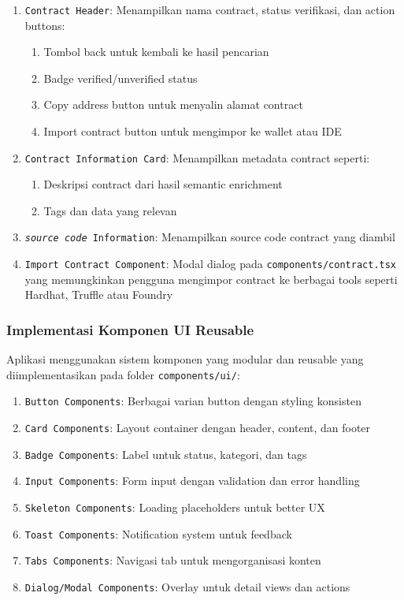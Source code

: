 \begin{enumerate}
	\item \texttt{Contract Header}: Menampilkan nama contract, status verifikasi, dan action buttons:
	      \begin{enumerate}
		      \item Tombol back untuk kembali ke hasil pencarian
		      \item Badge verified/unverified status
		      \item Copy address button untuk menyalin alamat contract
		      \item Import contract button untuk mengimpor ke wallet atau IDE
	      \end{enumerate}
	\item \texttt{Contract Information Card}: Menampilkan metadata contract seperti:
	      \begin{enumerate}
		      \item Deskripsi contract dari hasil semantic enrichment
		      \item Tags dan data yang relevan
	      \end{enumerate}
	\item \texttt{\textit{source code} Information}: Menampilkan source code contract yang diambil
	\item \texttt{Import Contract Component}: Modal dialog pada \texttt{components/\-contract.tsx} yang memungkinkan pengguna mengimpor contract ke berbagai tools seperti Hardhat, Truffle atau Foundry
\end{enumerate}

\subsubsection{Implementasi Komponen UI Reusable}

Aplikasi menggunakan sistem komponen yang modular dan reusable yang diimplementasikan pada folder \texttt{components/ui/}:

\begin{enumerate}
	\item \texttt{Button Components}: Berbagai varian button dengan styling konsisten
	\item \texttt{Card Components}: Layout container dengan header, content, dan footer
	\item \texttt{Badge Components}: Label untuk status, kategori, dan tags
	\item \texttt{Input Components}: Form input dengan validation dan error handling
	\item \texttt{Skeleton Components}: Loading placeholders untuk better UX
	\item \texttt{Toast Components}: Notification system untuk feedback
	\item \texttt{Tabs Components}: Navigasi tab untuk mengorganisasi konten
	\item \texttt{Dialog/Modal Components}: Overlay untuk detail views dan actions
\end{enumerate}

